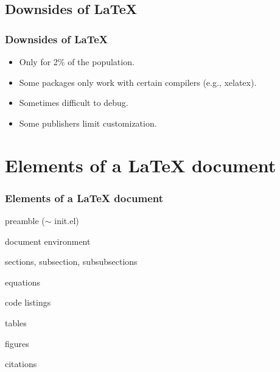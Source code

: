 \documentclass{beamer}
\newenvironment{checklist}{%
  \begin{list}{}{}%
  \let\olditem\item
  \renewcommand\item{\olditem[$\Box$] }
}{%
  \end{list}
}
\begin{document}
\subsection{Downsides of \LaTeX}
\begin{frame}
\frametitle{Downsides of \LaTeX }
\begin{center}
\begin{Large}
\begin{itemize}[font=$\bullet$\scshape\bfseries]
\item Only for 2\% of the population.
\item Some packages only work with certain compilers (e.g., xelatex).
\item Sometimes difficult to debug.
\item Some publishers limit customization.
\end{itemize}
\end{Large}
\end{center}
\end{frame}
\note{}


\section{Elements of a LaTeX document}
\begin{frame}
\frametitle{Elements of a LaTeX document}
\begin{center}
\begin{Large}
\begin{itemize}[font=$\bullet$\scshape\bfseries]
 \item preamble ($\sim$ init.el)
 \item document environment
 \begin{checklist}
 \item sections, subsection, subsubsections
 \item equations
 \item code listings
 \item tables
 \item figures
 \item citations
\end{checklist}
\end{itemize}
\end{Large}
\end{center}
\end{frame}
\note{}
\end{document}
